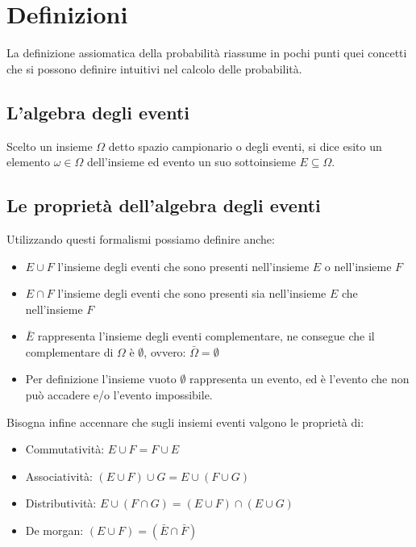 \section{Definizioni}
La definizione assiomatica della probabilità riassume in pochi punti quei concetti che si possono definire intuitivi nel calcolo delle probabilità.

\subsection{L'algebra degli eventi}
\begin{defin}
	Scelto un insieme $\Omega$ detto spazio campionario o degli eventi, si dice esito un elemento $\omega\in\Omega$ dell'insieme ed evento un suo sottoinsieme $E\subseteq\Omega$.

\end{defin}
\subsection*{Le proprietà dell'algebra degli eventi}
Utilizzando questi formalismi possiamo definire anche:
\begin{itemize}
\item $E \cup F$ l'insieme degli eventi che sono presenti nell'insieme $E$ o nell'insieme $F$
\item $E \cap F$ l'insieme degli eventi che sono presenti sia nell'insieme $E$ che nell'insieme $F$
\item $\bar E$ rappresenta l'insieme degli eventi complementare, ne consegue che il complementare di $\Omega$ è $\emptyset$, ovvero: $\bar \Omega = \emptyset$
\item Per definizione l'insieme vuoto $\emptyset$ rappresenta un evento, ed è l'evento che non può accadere e/o l'evento impossibile.
\end{itemize}
Bisogna infine accennare che sugli insiemi eventi valgono le proprietà di:
\begin{itemize}
\item Commutatività: $E \cup F = F \cup E$
\item Associatività: $(E \cup F) \cup G = E \cup (F \cup G)$
\item Distributività: $E \cup (F \cap G) = (E \cup F) \cap (E \cup G)$
\item De morgan: $(E \cup F) = (\bar E \cap \bar F)$
\end{itemize}

